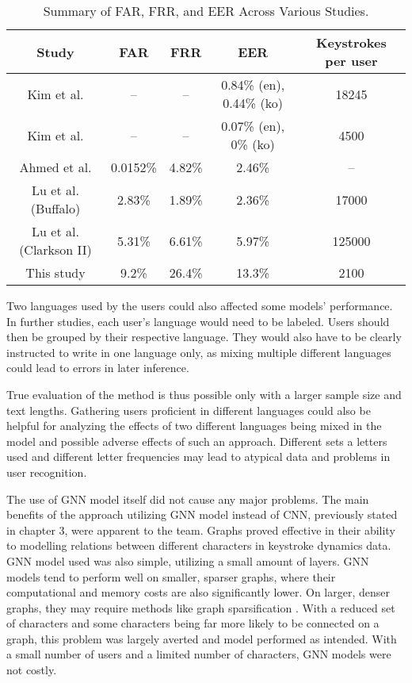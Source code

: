 \begin{center}
	\begin{table}[H]
		\begin{center}
			\begin{tabular}{ |c|c|c|c|c| } 
				\hline
				Study & FAR & FRR & EER & Keystrokes per user \\
				\hline
				Kim et al. \cite{kim2018} & -- & -- & 0.84\% (en), 0.44\% (ko) & 18245 \\
				\hline
				Kim et al. \cite{kim2020} & -- & -- & 0.07\% (en), 0\% (ko) & 4500 \\
				\hline
				Ahmed et al. \cite{ahmed2013} & 0.0152\% & 4.82\% & 2.46\% & -- \\
				\hline
				Lu et al. \cite{Lu2020} (Buffalo) & 2.83\% & 1.89\% & 2.36\% & 17000 \\
                \hline
                Lu et al. \cite{Lu2020} (Clarkson II) & 5.31\% & 6.61\% & 5.97\% & 125000 \\
                \hline
				This study & 9.2\% & 26.4\% & 13.3\% & 2100 \\
				\hline
			\end{tabular}
		\end{center}
		\caption{Summary of FAR, FRR, and EER Across Various Studies.}
		\label{table:studies_results}
	\end{table}
\end{center}

Two languages used by the users could also affected some models' performance. In further studies, each user's language would need to be labeled. Users should then be grouped by their respective language. They would also have to be clearly instructed to write in one language only, as mixing multiple different languages could lead to errors in later inference. 

True evaluation of the method is thus possible only with a larger sample size and text lengths. Gathering users proficient in different languages could also be helpful for analyzing the effects of two different languages being mixed in the model and possible adverse effects of such an approach. Different sets a letters used and different letter frequencies may lead to atypical data and problems in user recognition.

The use of GNN model itself did not cause any major problems. The main benefits of the approach utilizing GNN model instead of CNN, previously stated in chapter 3, were apparent to the team. Graphs proved effective in their ability to modelling relations between different characters in keystroke dynamics data. GNN model used was also simple, utilizing a small amount of layers. GNN models tend to perform well on smaller, sparser graphs, where their computational and memory costs are also significantly lower. On larger, denser graphs, they may require methods like graph sparsification \cite{zhang2024graphsparsificationmixturegraphs}. With a reduced set of characters and some characters being far more likely to be connected on a graph, this problem was largely averted and model performed as intended. With a small number of users and a limited number of characters, GNN models were not costly.